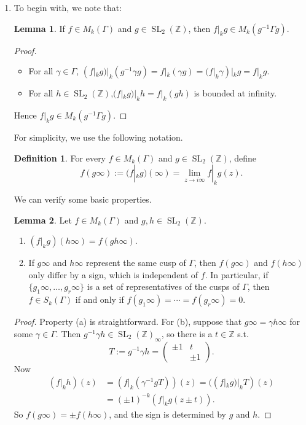 \documentclass{article}
\theoremstyle{definition}
\newtheorem{definition}{Definition}
\newtheorem{lemma}{Lemma}
\theoremstyle{remark}
\newcommand{\Z}{\mathbb{Z}}
\DeclareMathOperator{\SL}{SL}
\begin{document}
\begin{enumerate}
\item 
To begin with, we note that:
\begin{lemma}
    If $f\in M_k(\Gamma)$ and $g\in\SL_2(\Z)$,
    then $f|_kg\in M_k(g^{-1}\Gamma g)$.
\end{lemma}
\begin{proof}
\begin{itemize}
    \item For all $\gamma\in\Gamma$, $(f|_kg)|_k(g^{-1}\gamma g) = f|_k(\gamma g) = (f|_{k}\gamma) |_k g = f|_kg.$
    \item For all $h\in\SL_2(\Z)$,$(f|_k g)|_k h = f|_k(gh)$ is bounded at infinity.
\end{itemize}
Hence $f|_kg\in M_k(g^{-1}\Gamma g)$.
\end{proof}
For simplicity, we use the following notation.
\begin{definition}
    For every $f\in M_k(\Gamma)$ and $g\in\SL_2(\Z)$, define \[f(g\infty)
    := (f|_k g)(\infty) = \lim_{z\to i\infty} f|_k g(z).\]
\end{definition}
We can verify some basic properties.
\begin{lemma}\label{value at cusp}
    Let $f\in M_k(\Gamma)$ and $g, h\in\SL_2(\Z)$.
    \begin{enumerate}
        \item $(f|_kg)(h\infty) = f(gh\infty)$.
        \item If $g\infty$ and $h\infty$ represent the same cusp of $\Gamma$,
        then $f(g\infty)$ and $f(h\infty)$ only differ by a sign, which is independent of $f$.
        In particular, if $\{g_1\infty, \dots, g_r\infty\}$ is a set of representatives of the cusps of $\Gamma$, then $f\in S_k(\Gamma)$ if and only if $f(g_1\infty) = \cdots = f(g_r\infty) = 0$.
    \end{enumerate}
\end{lemma}
\begin{proof}
    Property (a) is straightforward.
    For (b), suppose that $g\infty = \gamma h\infty$ for some $\gamma\in\Gamma$. Then $g^{-1}\gamma h\in\SL_2(\Z)_\infty$, so there is a $t\in \Z$ s.t. \[T := g^{-1}\gamma h = \begin{pmatrix}
        \pm1 & t \\ & \pm1
    \end{pmatrix}.\]
    Now\begin{align*}
        (f|_kh)(z) &= (f|_k(\gamma^{-1}gT))(z) = ((f|_kg)|_kT)(z)\\
        &= (\pm 1)^{-k}(f|_k g(z\pm t)).
    \end{align*}
    So $f(g\infty) = \pm f(h\infty)$, and the sign is determined by $g$ and $h$.
\end{proof}



\end{enumerate}
\end{document}
